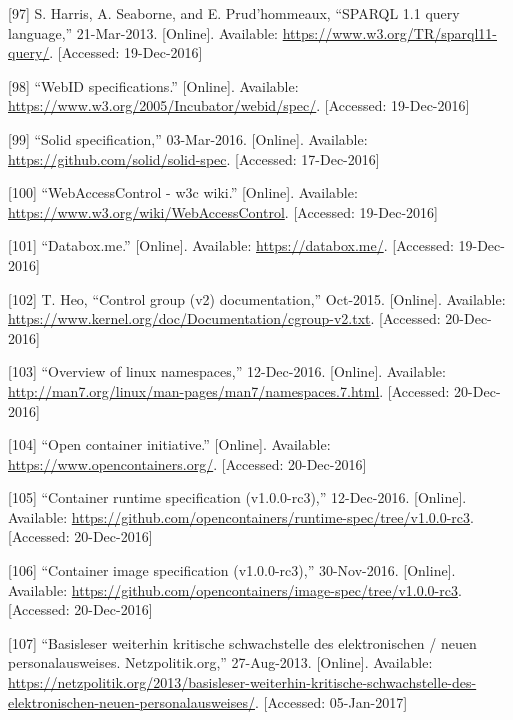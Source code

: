 \documentclass[12pt,english,a4paper,titlepage,cleardoublepage=empty,dottedtoc]{report}
\begin{document}
\hypertarget{ref-web_w3c-tr_sparql}{}
{[}97{]} S. Harris, A. Seaborne, and E. Prud'hommeaux, ``SPARQL 1.1
query language,'' 21-Mar-2013. {[}Online{]}. Available:
\url{https://www.w3.org/TR/sparql11-query/}. {[}Accessed: 19-Dec-2016{]}

\hypertarget{ref-web_w3c-draft_webid}{}
{[}98{]} ``WebID specifications.'' {[}Online{]}. Available:
\url{https://www.w3.org/2005/Incubator/webid/spec/}. {[}Accessed:
19-Dec-2016{]}

\hypertarget{ref-web_spec_solid}{}
{[}99{]} ``Solid specification,'' 03-Mar-2016. {[}Online{]}. Available:
\url{https://github.com/solid/solid-spec}. {[}Accessed: 17-Dec-2016{]}

\hypertarget{ref-web_2016_wiki_webaccesscontrol}{}
{[}100{]} ``WebAccessControl - w3c wiki.'' {[}Online{]}. Available:
\url{https://www.w3.org/wiki/WebAccessControl}. {[}Accessed:
19-Dec-2016{]}

\hypertarget{ref-web_2016_demo_databox}{}
{[}101{]} ``Databox.me.'' {[}Online{]}. Available:
\url{https://databox.me/}. {[}Accessed: 19-Dec-2016{]}

\hypertarget{ref-web_2015_cgroup-doc}{}
{[}102{]} T. Heo, ``Control group (v2) documentation,'' Oct-2015.
{[}Online{]}. Available:
\url{https://www.kernel.org/doc/Documentation/cgroup-v2.txt}.
{[}Accessed: 20-Dec-2016{]}

\hypertarget{ref-web_2016_kernel-namespace}{}
{[}103{]} ``Overview of linux namespaces,'' 12-Dec-2016. {[}Online{]}.
Available: \url{http://man7.org/linux/man-pages/man7/namespaces.7.html}.
{[}Accessed: 20-Dec-2016{]}

\hypertarget{ref-web_2016_open-container-initiative}{}
{[}104{]} ``Open container initiative.'' {[}Online{]}. Available:
\url{https://www.opencontainers.org/}. {[}Accessed: 20-Dec-2016{]}

\hypertarget{ref-web_oci-spec_runtime}{}
{[}105{]} ``Container runtime specification (v1.0.0-rc3),'' 12-Dec-2016.
{[}Online{]}. Available:
\url{https://github.com/opencontainers/runtime-spec/tree/v1.0.0-rc3}.
{[}Accessed: 20-Dec-2016{]}

\hypertarget{ref-web_oci-spec_image}{}
{[}106{]} ``Container image specification (v1.0.0-rc3),'' 30-Nov-2016.
{[}Online{]}. Available:
\url{https://github.com/opencontainers/image-spec/tree/v1.0.0-rc3}.
{[}Accessed: 20-Dec-2016{]}

\hypertarget{ref-web_2013_npa-sicherheitsdefizit}{}
{[}107{]} ``Basisleser weiterhin kritische schwachstelle des
elektronischen / neuen personalausweises. Netzpolitik.org,''
27-Aug-2013. {[}Online{]}. Available:
\url{https://netzpolitik.org/2013/basisleser-weiterhin-kritische-schwachstelle-des-elektronischen-neuen-personalausweises/}.
{[}Accessed: 05-Jan-2017{]}
\end{document}

